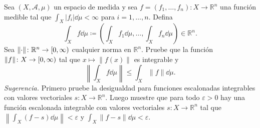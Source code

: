 \setcounter{neje}{40}
\begin{nejer}
Sea $(X, \mathcal{A}, \mu)$ un espacio de medida y sea $f = (f_1, \dots, f_n) \colon X \to \mathbb{R}^n$ una función medible tal que $\int_X |f_i| \dd{\mu} < \infty$ para $i = 1, \dots, n$. Defina
$$
\int_X f \dd{\mu} \coloneq \left( \int_X f_1 \dd{\mu}, \dots, \int_X f_n \dd{\mu} \right) \in \mathbb{R}^n.
$$
Sea $\norm{\cdot} \colon \mathbb{R}^n \to [0, \infty)$ cualquier norma en $\mathbb{R}^n$. Pruebe que la función $\norm{f}\colon X \to [0, \infty)$ tal que $x \mapsto \|f(x)\|$ es integrable y
$$
\left\| \int_X f \dd{\mu} \right\| \le \int_X \|f\| \dd{\mu}.
$$
\emph{Sugerencia.} Primero pruebe la desigualdad para funciones escalonadas integrables con valores vectoriales $s \colon X \to \mathbb{R}^n$. Luego muestre que para todo $\varepsilon > 0$ hay una función escalonada integrable con valores vectoriales $s \colon X \to \mathbb{R}^n$ tal que $\left\| \int_X (f - s) \dd{\mu} \right\| < \varepsilon$ y $\int_X \|f - s\| \dd{\mu} < \varepsilon$.
\end{nejer}
